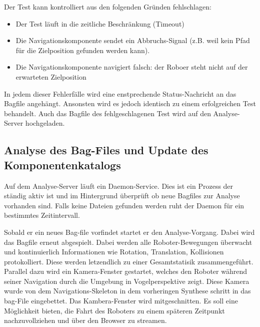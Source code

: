Der Test kann kontrolliert aus den folgenden Gründen fehlschlagen:
\begin{itemize}
\item Der Test läuft in die zeitliche Beschränkung (Timeout)
\item Die Navigationskomponente sendet ein Abbruchs-Signal (z.B. weil kein Pfad für die Zielposition gefunden werden kann).
\item Die Navigationskomponente navigiert falsch: der Roboer steht nicht auf der erwarteten Zielposition
\end{itemize}
In jedem dieser Fehlerfälle wird eine enstprechende Status-Nachricht an das Bagfile angehängt. Ansonsten wird es jedoch identisch zu einem erfolgreichen Test behandelt. Auch das Bagfile des fehlgeschlagenen Test wird auf den Analyse-Server hochgeladen.

\subsection{Analyse des Bag-Files und Update des Komponentenkatalogs}
Auf dem Analyse-Server läuft ein Daemon-Service. Dies ist ein Prozess der ständig aktiv ist und im Hintergrund überprüft ob neue Bagfiles zur Analyse vorhanden sind. Falls keine Dateien gefunden werden ruht der Daemon für ein bestimmtes Zeitintervall.

Sobald er ein neues Bag-file vorfindet startet er den Analyse-Vorgang. Dabei wird das Bagfile erneut abgespielt. Dabei werden alle Roboter-Bewegungen überwacht und kontinuierlich Informationen wie Rotation, Translation, Kollisionen protokolliert. Diese werden letzendlich zu einer Gesamtstatisik zusammengeführt. Parallel dazu wird ein Kamera-Fenster gestartet, welches den Roboter während seiner Navigation durch die Umgebung in Vogelperspektive zeigt. Diese Kamera wurde von dem Navigations-Skeleton in dem vorheringen Synthese schritt in das bag-File eingebettet. Das Kambera-Fenster wird mitgeschnitten. Es soll eine Möglichkeit bieten, die Fahrt des Roboters zu einem späteren Zeitpunkt nachzuvollziehen und über den Browser zu streamen.

